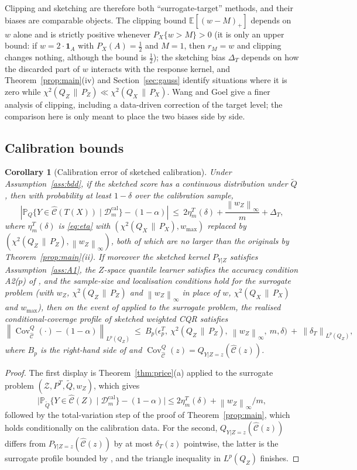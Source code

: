 \documentclass[11pt,a4paper]{article}
\newcommand{\PX}{P_X}
\newcommand{\QX}{Q_X}
\newcommand{\chisq}{\chi^2(\QX\,\|\,\PX)}
\newcommand{\chisqZ}{\chi^2(Q_Z\,\|\,P_Z)}
\newcommand{\Lp}[1]{L^p(#1)}
\newcommand{\norm}[1]{\left\|#1\right\|}
\newcommand{\abs}[1]{\left|#1\right|}
\newcommand{\Cov}{\operatorname{Cov}}
\newcommand{\E}{\mathbb{E}}
\newcommand{\Prob}{\mathbb{P}}
\newcommand{\Cset}{\widehat{\mathcal C}}
\newcommand{\Zc}{\mathcal Z}
\newcommand{\Qt}{\widetilde Q}
\newcommand{\ind}{\mathbf 1}
\theoremstyle{plain}
\newtheorem{corollary}[theorem]{Corollary}
\theoremstyle{definition}
\theoremstyle{remark}
\begin{document}
Clipping and sketching are therefore both ``surrogate-target'' methods, and their biases are comparable objects. The clipping bound $\E[(w-M)_+]$ depends on $w$ alone and is strictly positive whenever $\PX\{w>M\}>0$ (it is only an upper bound: if $w=2\cdot\ind_A$ with $\PX(A)=\tfrac12$ and $M=1$, then $r_M=w$ and clipping changes nothing, although the bound is $\tfrac12$); the sketching bias $\Delta_T$ depends on how the discarded part of $w$ interacts with the response kernel, and Theorem~\ref{prop:main}(iv) and Section~\ref{sec:gauss} identify situations where it is zero while $\chisqZ\ll\chisq$. Wang and Goel \cite{wang2026} give a finer analysis of clipping, including a data-driven correction of the target level; the comparison here is only meant to place the two biases side by side.

\subsection{Calibration bounds}

\begin{corollary}[Calibration error of sketched calibration]\label{cor:profile}
Under Assumption~\ref{ass:bdd}, if the sketched score has a continuous distribution under $\Qt$, then with probability at least $1-\delta$ over the calibration sample,
\[
\abs{\Prob_Q\{Y\in\Cset(T(X))\mid\mathcal D^{\mathrm{cal}}_m\}-(1-\alpha)}\ \le\ 2\eta^T_m(\delta)+\frac{\norm{w_Z}_\infty}{m}+\Delta_T,
\]
where $\eta^T_m(\delta)$ is \eqref{eq:eta} with $(\chisq,w_{\max})$ replaced by $(\chisqZ,\norm{w_Z}_\infty)$, both of which are no larger than the originals by Theorem~\ref{prop:main}(ii). If moreover the sketched kernel $P_{Y|Z}$ satisfies Assumption~\ref{ass:A1}, the $Z$-space quantile learner satisfies the accuracy condition A2($p$) of \cite{isaev2026}, and the sample-size and localisation conditions \cite[eq.\ (22)]{isaev2026} hold for the surrogate problem (with $w_Z$, $\chisqZ$ and $\norm{w_Z}_\infty$ in place of $w$, $\chisq$ and $w_{\max}$), then on the event of \cite[Thm.\ 5]{isaev2026} applied to the surrogate problem, the realised conditional-coverage profile of sketched weighted CQR satisfies
\[
\norm{\Cov^{Q}_{\Cset}(\cdot)-(1-\alpha)}_{\Lp{Q_Z}}
\ \le\ B_p\bigl(\epsilon^T_p,\ \chisqZ,\ \norm{w_Z}_\infty,\ m,\delta\bigr)\ +\ \norm{\delta_T}_{\Lp{Q_Z}},
\]
where $B_p$ is the right-hand side of \cite[eq.\ (24)]{isaev2026} and $\Cov^Q_{\Cset}(z)=Q_{Y|Z=z}(\Cset(z))$.
\end{corollary}

\begin{proof}
The first display is Theorem~\ref{thm:price}(a) applied to the surrogate problem $(\Zc,P^T,\Qt,w_Z)$, which gives
\[
\bigl|\Prob_{\Qt}\{Y\in\Cset(Z)\mid\mathcal D^{\mathrm{cal}}_m\}-(1-\alpha)\bigr|\le2\eta^T_m(\delta)+\norm{w_Z}_\infty/m,
\]
followed by the total-variation step of the proof of Theorem~\ref{prop:main}, which holds conditionally on the calibration data. For the second, $Q_{Y|Z=z}(\Cset(z))$ differs from $P_{Y|Z=z}(\Cset(z))$ by at most $\delta_T(z)$ pointwise, the latter is the surrogate profile bounded by \cite[Thm.\ 5]{isaev2026}, and the triangle inequality in $\Lp{Q_Z}$ finishes.
\end{proof}
\end{document}
